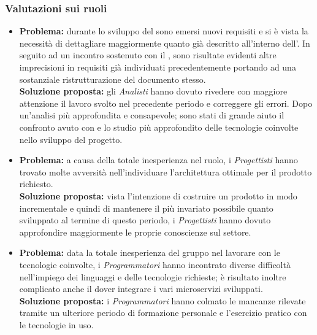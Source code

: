 \subsubsection{Valutazioni sui ruoli}
\begin{itemize}
	\item \textbf{Problema:} durante lo sviluppo del  sono emersi nuovi requisiti e si è vista la necessità di dettagliare maggiormente quanto già descritto all'interno dell'{\AdR}. In seguito ad un incontro sostenuto con il {\CR}, sono risultate evidenti altre imprecisioni in requisiti già individuati precedentemente portando ad una sostanziale ristrutturazione del documento stesso.\\
	\textbf{Soluzione proposta:} gli \textit{Analisti} hanno dovuto rivedere con maggiore attenzione il lavoro svolto nel precedente periodo e correggere gli errori. Dopo un'analisi più approfondita e consapevole; sono stati di grande aiuto il confronto avuto con {\Proponente} e lo studio più approfondito delle tecnologie coinvolte nello sviluppo del progetto.
\end{itemize}
\begin{itemize}
	\item \textbf{Problema:} a causa della totale inesperienza nel ruolo, i \textit{Progettisti} hanno trovato molte avversità nell'individuare l'architettura ottimale per il prodotto richiesto.\\
	\textbf{Soluzione proposta:} vista l'intenzione di costruire un prodotto in modo incrementale e quindi di mantenere il più invariato possibile quanto sviluppato al termine di questo periodo, i \textit{Progettisti} hanno dovuto approfondire maggiormente le proprie conoscienze sul settore.
\end{itemize}
\begin{itemize}
	\item \textbf{Problema:} data la totale inesperienza del gruppo nel lavorare con le tecnologie coinvolte, i \textit{Programmatori} hanno incontrato diverse difficoltà nell'impiego dei linguaggi e delle tecnologie richieste; è risultato inoltre complicato anche il dover integrare i vari microservizi sviluppati.\\
	\textbf{Soluzione proposta:} i \textit{Programmatori} hanno colmato le mancanze rilevate tramite un ulteriore periodo di formazione personale e l'esercizio pratico con le tecnologie in uso.
\end{itemize}